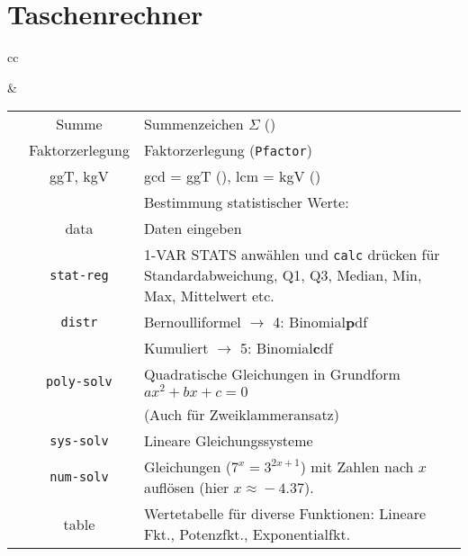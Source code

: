 \headerUndFooterJedeSeite{}
\newpage
\headerUndFooterJedeSeite{}

\section*{Taschenrechner}

\begin{tabular}{cc}


&

\begin{tabular}{c|c|p{80mm}}\hline
\tiprobutton{math}         &Summe             & Summenzeichen $\Sigma$ (\tiprobutton{5})\\
                           &Faktorzerlegung   & Faktorzerlegung (\tiprobutton{4}\texttt{Pfactor})\\
                           & ggT, kgV         & gcd = ggT
(\tiprobutton{3}), lcm = kgV (\tiprobutton{2})\\\hline
                           &                  & Bestimmung statistischer Werte:\\
\tiprobutton{data}         & data             & Daten eingeben\\
                           &\texttt{stat-reg} & 1-VAR STATS anwählen
und \texttt{calc} drücken für Standardabweichung, Q1, Q3, Median, Min,
Max, Mittelwert etc.\\
                           &\texttt{distr}    & Bernoulliformel $\rightarrow$ 4: Binomial\textbf{p}df\\
                           &                  & Kumuliert $\rightarrow$ 5: Binomial\textbf{c}df\\\hline
\tiprobutton{cos_poly-solv}&\texttt{poly-solv}&  Quadratische Gleichungen in Grundform $ax^2+bx+c=0$\\
                           &                  &  (Auch für Zweiklammeransatz)\\\hline
\tiprobutton{tan_sys-solv} &\texttt{sys-solv} &  Lineare Gleichungssysteme\\\hline
\tiprobutton{sin_num-solv} &\texttt{num-solv} &  Gleichungen ($7^x=3^{2x+1}$) mit Zahlen nach $x$ auf\/lösen (hier $x\approx{}-4.37$).\\\hline
\tiprobutton{table}        & table            &  Wertetabelle für diverse Funktionen: Lineare Fkt., Potenzfkt., Exponentialfkt.\\\hline

\end{tabular}
\end{tabular}
